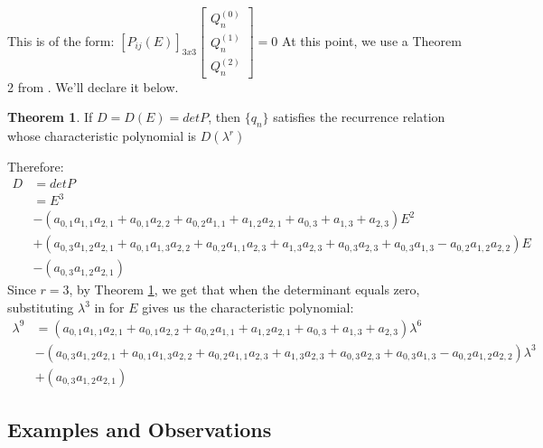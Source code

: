 \documentclass[a4paper]{article}
\theoremstyle{definition}
\newtheorem{theorem}{Theorem}[section]
\begin{document}
This is of the form:
$
[P_{ij}(E)]_{3 x 3}
\begin{bmatrix}
    Q_{n}^{(0)} \\
    Q_{n}^{(1)} \\
    Q_{n}^{(2)}
\end{bmatrix}
=0
$
At this point, we use a Theorem 2 from \cite{bib:gen_cond_rec}. We'll declare it below.
\begin{theorem}
If $D=D(E)=detP$, then $\{q_n\}$  satisfies the recurrence relation whose characteristic polynomial is $D(\lambda^r)$
\label{thm:det-is-char-poly-dxr}
\end{theorem}
Therefore:
\begin{align*}
D
&=detP \\
&=E^3 \\
&- (a_{0,1}a_{1,1}a_{2,1}+a_{0,1}a_{2,2}+a_{0,2}a_{1,1}+a_{1,2}a_{2,1}+a_{0,3}+a_{1,3}+a_{2,3})E^2 \\
&+ (a_{0,3}a_{1,2}a_{2,1}+a_{0,1}a_{1,3}a_{2,2}+a_{0,2}a_{1,1}a_{2,3}+a_{1,3}a_{2,3}+a_{0,3}a_{2,3}+a_{0,3}a_{1,3}-a_{0,2}a_{1,2}a_{2,2})E \\
&-(a_{0,3}a_{1,2}a_{2,1})
\end{align*}
Since $r=3$, by Theorem \ref{thm:det-is-char-poly-dxr}, we get that when the determinant equals zero, substituting $\lambda^3$ in for $E$ gives us the characteristic polynomial:
\begin{align*}
\lambda^9
&= (a_{0,1}a_{1,1}a_{2,1}+a_{0,1}a_{2,2}+a_{0,2}a_{1,1}+a_{1,2}a_{2,1}+a_{0,3}+a_{1,3}+a_{2,3})\lambda^6 \\
&- (a_{0,3}a_{1,2}a_{2,1}+a_{0,1}a_{1,3}a_{2,2}+a_{0,2}a_{1,1}a_{2,3}+a_{1,3}a_{2,3}+a_{0,3}a_{2,3}+a_{0,3}a_{1,3}-a_{0,2}a_{1,2}a_{2,2})\lambda^3 \\
&+(a_{0,3}a_{1,2}a_{2,1})
\end{align*}

\subsection{Examples and Observations}
\end{document}
